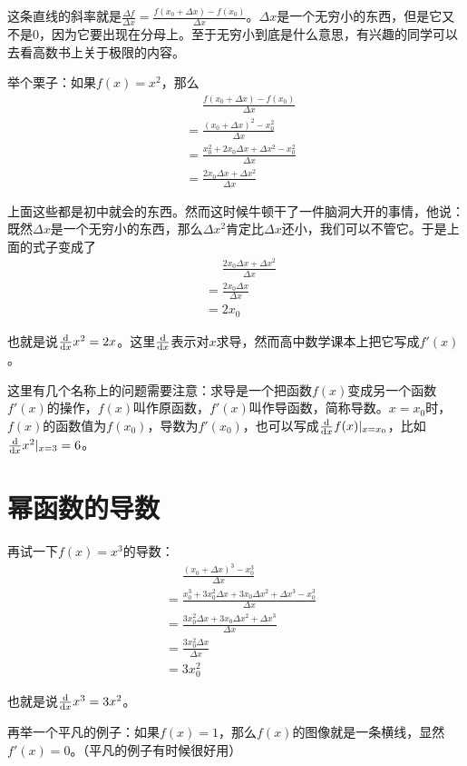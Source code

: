 这条直线的斜率就是$\frac{\Delta f}{\Delta x}=\frac{f(x_0+\Delta x)-f(x_0)}{\Delta x}$。$\Delta x$是一个无穷小的东西，但是它又不是$0$，因为它要出现在分母上。至于无穷小到底是什么意思，有兴趣的同学可以去看高数书上关于极限的内容。

举个栗子：如果$f(x)=x^2$，那么
\begin{align*}
&\mathrel{\phantom{=}}\frac{f(x_0+\Delta x)-f(x_0)}{\Delta x} \\
&=\frac{(x_0+\Delta x)^2-x_0^2}{\Delta x} \\
&=\frac{x_0^2+2 x_0 \Delta x+\Delta x^2-x_0^2}{\Delta x} \\
&=\frac{2 x_0 \Delta x+\Delta x^2}{\Delta x}
\end{align*}

上面这些都是初中就会的东西。然而这时候牛顿干了一件脑洞大开的事情，他说：既然$\Delta x$是一个无穷小的东西，那么$\Delta x^2$肯定比$\Delta x$还小，我们可以不管它。于是上面的式子变成了
\begin{align*}
&\mathrel{\phantom{=}}\frac{2 x_0 \Delta x+\Delta x^2}{\Delta x} \\
&=\frac{2 x_0 \Delta x}{\Delta x} \\
&=2 x_0
\end{align*}

也就是说$\frac{\mathop{}\!\mathrm{d}}{\mathop{}\!\mathrm{d} x} x^2=2 x$。这里$\frac{\mathop{}\!\mathrm{d}}{\mathop{}\!\mathrm{d} x}$表示对$x$求导，然而高中数学课本上把它写成$f'(x)$。

这里有几个名称上的问题需要注意：求导是一个把函数$f(x)$变成另一个函数$f'(x)$的操作，$f(x)$叫作原函数，$f'(x)$叫作导函数，简称导数。$x=x_0$时，$f(x)$的函数值为$f(x_0)$，导数为$f'(x_0)$，也可以写成$\frac{\mathop{}\!\mathrm{d}}{\mathop{}\!\mathrm{d} x} f(x)|_{x=x_0}$，比如$\frac{\mathop{}\!\mathrm{d}}{\mathop{}\!\mathrm{d} x} x^2|_{x=3}=6$。
\section{幂函数的导数}
再试一下$f(x)=x^3$的导数：
\begin{align*}
&\mathrel{\phantom{=}}\frac{(x_0+\Delta x)^3-x_0^3}{\Delta x} \\
&=\frac{x_0^3+3 x_0^2 \Delta x+3 x_0 \Delta x^2+\Delta x^3-x_0^3}{\Delta x} \\
&=\frac{3 x_0^2 \Delta x+3 x_0 \Delta x^2+\Delta x^3}{\Delta x} \\
&=\frac{3 x_0^2 \Delta x}{\Delta x} \\
&=3 x_0^2
\end{align*}

也就是说$\frac{\mathop{}\!\mathrm{d}}{\mathop{}\!\mathrm{d} x} x^3=3 x^2$。

再举一个平凡的例子：如果$f(x)=1$，那么$f(x)$的图像就是一条横线，显然$f'(x)=0$。（平凡的例子有时候很好用）

